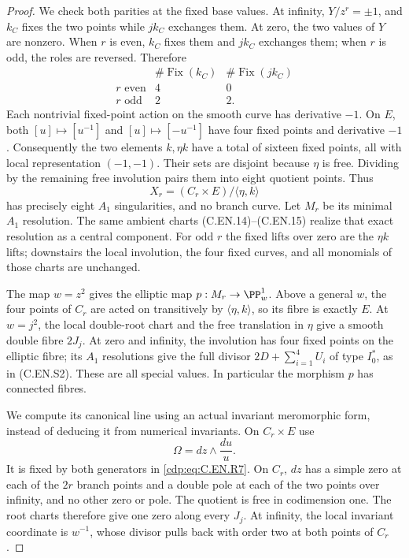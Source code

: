 \begin{proof}
We check both parities at the fixed base values.
At infinity, $Y/z^r=\pm1$, and $k_C$
fixes the two points while $jk_C$ exchanges
them. At zero, the two values of $Y$ are
nonzero. When $r$ is even, $k_C$ fixes
them and $jk_C$ exchanges them; when $r$
is odd, the roles are reversed. Therefore
\[
 \begin{array}{c|cc}
 &\#\operatorname{Fix}(k_C)&
       \#\operatorname{Fix}(jk_C)\\ \hline
 r\text{ even}&4&0\\
 r\text{ odd}&2&2 .
 \end{array}                                             \tag{C.EN.R8}\label{cdp:eq:C.EN.R8}
\]
Each nontrivial fixed-point action on the
smooth curve has derivative $-1$.
On $E$, both $[u]\mapsto[u^{-1}]$
and $[u]\mapsto[-u^{-1}]$ have four
fixed points and derivative $-1$.
Consequently the two elements $k,\eta k$
have a total of sixteen fixed points,
all with local representation $(-1,-1)$.
Their sets are disjoint because $\eta$
is free. Dividing by the remaining free
involution pairs them into eight quotient
points. Thus
\[
 X_r=(C_r\times E)/\langle\eta,k\rangle
                                                               \tag{C.EN.R9}\label{cdp:eq:C.EN.R9}
\]
has precisely eight $A_1$ singularities,
and no branch curve. Let $M_r$ be its
minimal $A_1$ resolution. The same
ambient charts (C.EN.14)--(C.EN.15)
realize that exact resolution as a
central component. For odd $r$ the
fixed lifts over zero are the
$\eta k$ lifts; downstairs the local
involution, the four fixed curves,
and all monomials of those charts
are unchanged.

The map $w=z^2$ gives the elliptic map
$p:M_r\to\PP^1_w$. Above a general $w$,
the four points of $C_r$ are acted on
transitively by $\langle\eta,k\rangle$,
so its fibre is exactly $E$. At $w=j^2$,
the local double-root chart and the free
translation in $\eta$ give a smooth
double fibre $2J_j$. At zero and infinity,
the involution has four fixed points on
the elliptic fibre; its $A_1$ resolutions
give the full divisor
$2D+\sum_{i=1}^4 U_i$ of type $I_0^*$,
as in (C.EN.S2). These are all special
values. In particular the morphism $p$
has connected fibres.

We compute its canonical line using an
actual invariant meromorphic form,
instead of deducing it from numerical
invariants. On $C_r\times E$ use
\[
                       \Omega=dz\wedge\frac{du}{u}.
                                                               \tag{C.EN.R10}\label{cdp:eq:C.EN.R10}
\]
It is fixed by both generators in
\eqref{cdp:eq:C.EN.R7}. On $C_r$, $dz$ has a simple
zero at each of the $2r$ branch points
and a double pole at each of the two
points over infinity, and no other
zero or pole. The quotient is free
in codimension one. The root charts
therefore give one zero along every
$J_j$. At infinity, the local invariant
coordinate is $w^{-1}$, whose divisor
pulls back with order two at both
points of $C_r$.


\end{proof}
